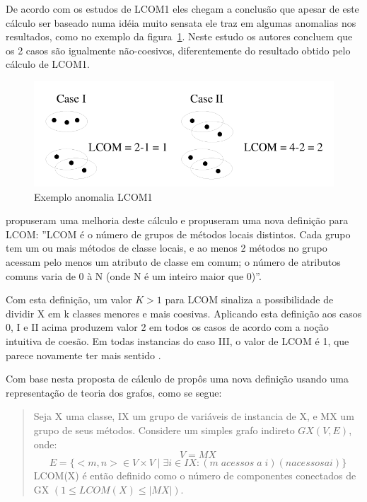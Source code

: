 De acordo com os estudos de  LCOM1
eles chegam a conclusão que apesar de este cálculo ser baseado numa idéia muito
sensata ele traz em algumas anomalias nos resultados, como no exemplo da
figura~\ref{fig:exemplo-anomalia-lcom1}. Neste estudo os autores concluem que
os 2 casos são igualmente não-coesivos, diferentemente do resultado obtido pelo
cálculo de LCOM1.

\begin{figure}[h]
\center
\includegraphics[scale=0.4]{imagens/exemplo-anomalia-lcom1-hitz-e-montazeri}
\caption{Exemplo anomalia LCOM1 \cite{measuringCouplingAndCohesion}}
\label{fig:exemplo-anomalia-lcom1}
\end{figure}

 propuseram uma melhoria deste
cálculo e propuseram uma nova definição para LCOM: ''LCOM é o número de grupos
de métodos locais distintos.  Cada grupo tem um ou mais métodos de classe
locais, e ao menos 2 métodos no grupo acessam pelo menos um atributo de classe
em comum; o número de atributos comuns varia de 0 à N (onde N é um inteiro
maior que 0)''.

Com esta definição, um valor $K > 1$ para LCOM sinaliza a possibilidade de
dividir X em k classes menores e mais coesivas. Aplicando esta definição aos
casos 0, I e II acima produzem valor 2 em todos os casos de acordo com a noção
intuitiva de coesão. Em todas instancias do caso III, o valor de LCOM é 1, que
parece novamente ter mais sentido \cite{measuringCouplingAndCohesion}.

Com base nesta proposta de cálculo de
 propôs uma nova definição usando uma
representação de teoria dos grafos, como se segue:

\begin{quotation}
Seja X uma classe, IX um grupo de variáveis de instancia de X, e MX um grupo
de seus métodos. Considere um simples grafo indireto $GX(V, E)$, onde: $$V =
MX$$ $$E = \{<m, n> \in V \times V \mid \exists i \in IX: (m \; acessos \; a \;
i) (n acessos a i)\}$$ LCOM(X) é então definido como o número de componentes
conectados de GX $(1 \leq LCOM(X) \leq |MX|)$.
\end{quotation}

